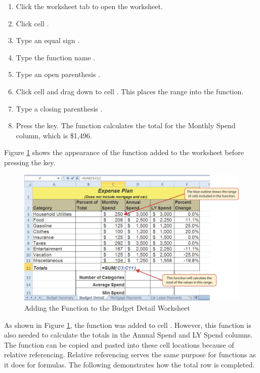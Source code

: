 \begin{enumerate}
	\item Click the  worksheet tab to open the worksheet.
	\item Click cell .
	\item Type an equal sign \fmtTyping{=}.
	\item Type the function name .
	\item Type an open parenthesis \fmtTyping{(}.
	\item Click cell  and drag down to cell . This places the range  into the function.
	\item Type a closing parenthesis \fmtTyping{)}.
	\item Press the  key. The function calculates the total for the Monthly Spend column, which is \$1,496.
\end{enumerate}

Figure \ref{02:fig11} shows the appearance of the  function added to the  worksheet before pressing the  key.

\begin{figure}[H]
	\centering
	\includegraphics[width=\maxwidth{.95\linewidth}]{gfx/ch02_fig11}
	\caption{Adding the  Function to the Budget Detail Worksheet}
	\label{02:fig11}
\end{figure}

As shown in Figure \ref{02:fig11}, the  function was added to cell . However, this function is also needed to calculate the totals in the Annual Spend and LY Spend columns. The function can be copied and pasted into these cell locations because of relative referencing. Relative referencing serves the same purpose for functions as it does for formulas. The following demonstrates how the total row is completed.

